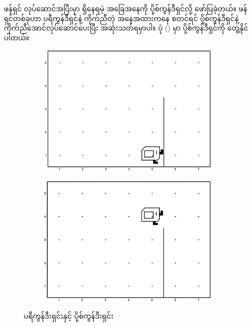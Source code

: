 ဖန်ရှင် လုပ်ဆောင်အပြီးမှာ ရှိနေရမဲ့ အခြေအနေကို ပို့စ်ကွန်ဒီရှင်လို့ ဖော်ပြခဲ့တယ်။ ဖန်ရှင်တစ်ခုဟာ ပရီကွန်ဒီရှင်နဲ့ ကိုက်ညီတဲ့ အနေအထားကနေ စတင်ရင် ပို့စ်ကွန်ဒီရှင်နဲ့ ကိုက်ညီအောင်လုပ်ဆောင်ပေးပြီး အဆုံးသတ်ရမှာပါ။ ပုံ \fRefNo{\ref{fig:mutp_pre_and_post}} () မှာ  ပို့စ်ကွန်ဒီရှင်ကို တွေ့နိုင်ပါတယ်။
%
\begin{figure}[htb!]
    \hfuzz=100pt
    \newcommand{\figpctw}{0.52}
    \newcommand{\figscale}{0.165}
    \begin{subfigure}[t]{{\figpctw}\textwidth}
        \includegraphics[scale=\figscale]{images/ch03/to_the_top/move_up_the_pole_pre1.jpg}
        \caption{}   
        \label{fig:mutp_pre1}
    \end{subfigure}
    \begin{subfigure}[t]{{\figpctw}\textwidth}
        \includegraphics[scale=\figscale]{images/ch03/to_the_top/move_up_the_pole_post1.jpg}
        \caption{} 
        \label{fig:mutp_post}   
    \end{subfigure}
    \caption{ ပရီကွန်ဒီးရှင်းနှင့် ပို့စ်ကွန်ဒီးရှင်း}
    \label{fig:mutp_pre_and_post}
\end{figure}


